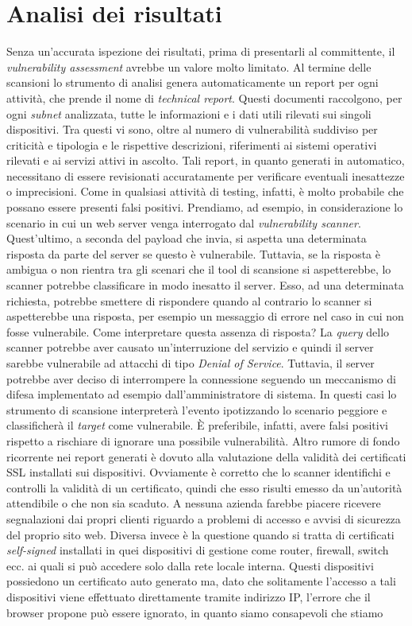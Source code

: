\documentclass[target=bach,aauheader=]{thud}
\begin{document}
\section{Analisi dei risultati}
Senza un’accurata ispezione dei risultati, prima di presentarli al committente, il \textit{vulnerability assessment} avrebbe un valore molto limitato. Al termine delle scansioni lo strumento di analisi genera automaticamente un report per ogni attività, che prende il nome di \textit{technical report}. Questi documenti raccolgono, per ogni \textit{subnet} analizzata, tutte le informazioni e i dati utili rilevati sui singoli dispositivi. Tra questi vi sono, oltre al numero di vulnerabilità suddiviso per criticità e tipologia e le rispettive descrizioni, riferimenti ai sistemi operativi rilevati e ai servizi attivi in ascolto. Tali report, in quanto generati in automatico, necessitano di essere revisionati accuratamente per verificare eventuali inesattezze o imprecisioni. Come in qualsiasi attività di testing, infatti, è molto probabile che possano essere presenti falsi positivi. Prendiamo, ad esempio, in considerazione lo scenario in cui un web server venga interrogato dal \textit{vulnerability scanner}. Quest’ultimo, a seconda del payload che invia, si aspetta una determinata risposta da parte del server se questo è vulnerabile. Tuttavia, se la risposta è ambigua o non rientra tra gli scenari che il tool di scansione si aspetterebbe, lo scanner potrebbe classificare in modo inesatto il server. Esso, ad una determinata richiesta, potrebbe smettere di rispondere quando al contrario lo scanner si aspetterebbe una risposta, per esempio un messaggio di errore nel caso in cui non fosse vulnerabile. Come interpretare questa assenza di risposta? La \textit{query} dello scanner potrebbe aver causato un’interruzione del servizio e quindi il server sarebbe vulnerabile ad attacchi di tipo \textit{Denial of Service}. Tuttavia, il server potrebbe aver deciso di interrompere la connessione seguendo un meccanismo di difesa implementato ad esempio dall’amministratore di sistema. In questi casi lo strumento di scansione interpreterà l’evento ipotizzando lo scenario peggiore e classificherà il \textit{target} come vulnerabile. È preferibile, infatti, avere falsi positivi rispetto a rischiare di ignorare una possibile vulnerabilità. Altro rumore di fondo ricorrente nei report generati è dovuto alla valutazione della validità dei certificati SSL installati sui dispositivi. Ovviamente è corretto che lo scanner identifichi e controlli la validità di un certificato, quindi che esso risulti emesso da un’autorità attendibile o che non sia scaduto. A nessuna azienda farebbe piacere ricevere segnalazioni dai propri clienti riguardo a problemi di accesso e avvisi di sicurezza del proprio sito web. Diversa invece è la questione quando si tratta di certificati \textit{self-signed} installati in quei dispositivi di gestione come router, firewall, switch ecc. ai quali si può accedere solo dalla rete locale interna. Questi dispositivi possiedono un certificato auto generato ma, dato che solitamente l’accesso a tali dispositivi viene effettuato direttamente tramite indirizzo IP, l’errore che il browser propone può essere ignorato, in quanto siamo consapevoli che stiamo 
\end{document}
